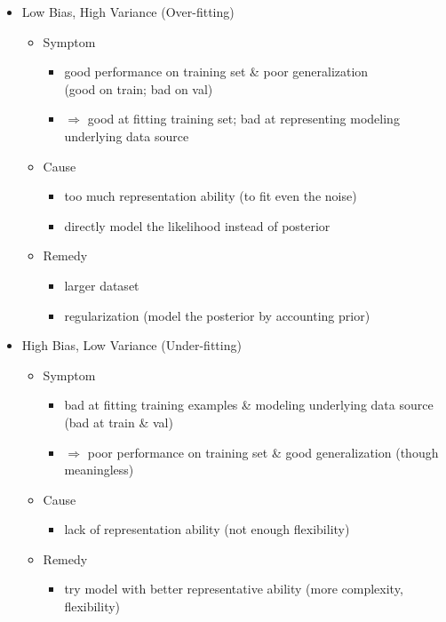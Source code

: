 \begin{itemize}
\item Low Bias, High Variance (Over-fitting)
	\begin{itemize}
	\item Symptom
		\begin{itemize}
		\item good performance on training set \& poor generalization \\
		(good on train; bad on val)
		\item $\Rightarrow$ good at fitting training set; bad at representing modeling underlying data source
		\end{itemize}
	\item Cause
		\begin{itemize}
		\item too much representation ability (to fit even the noise)
		\item directly model the likelihood instead of posterior
		\end{itemize}
	\item Remedy
		\begin{itemize}
		\item larger dataset
		\item regularization (model the posterior by accounting prior)
		\end{itemize}
	\end{itemize}
\item High Bias, Low Variance (Under-fitting)
	\begin{itemize}
	\item Symptom
		\begin{itemize}
		\item bad at fitting training examples \& modeling underlying data source \\ 
		(bad at train \& val)
		\item $\Rightarrow$ poor performance on training set \& good generalization (though meaningless)
		\end{itemize}
	\item Cause
		\begin{itemize}
		\item lack of representation ability (not enough flexibility)
		\end{itemize}
	\item Remedy
		\begin{itemize}
		\item try model with better representative ability (more complexity, flexibility)
		\end{itemize}

\end{itemize}
\end{itemize}

